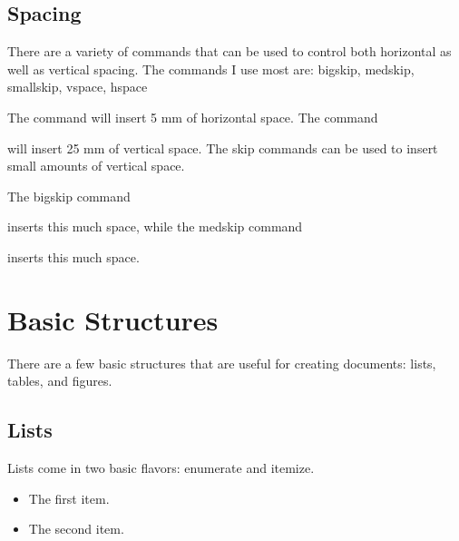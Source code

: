 \documentclass{article}
\begin{document}
\subsection{Spacing}

There are a variety of commands that can be used to control both
horizontal as well as vertical spacing. The commands I use most
are: bigskip, medskip, smallskip, vspace, hspace


The command \hspace{5mm} will insert 5 mm of horizontal space. The
command

\vspace{25mm}

will insert 25 mm of vertical space. The skip commands can be used
to insert small amounts of vertical space.

\noindent The bigskip command

\bigskip

\noindent inserts this much space, while the medskip command

\medskip

\noindent inserts this much space.



\section{Basic Structures}

There are a few basic structures that are useful for creating
documents: lists, tables, and figures.


\subsection{Lists}

Lists come in two basic flavors: enumerate and itemize.


\begin{itemize}
\item The first item. %
\item The second item. %
\end{itemize}
\end{document}
